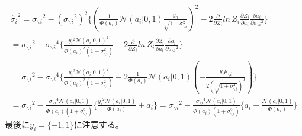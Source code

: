 \documentclass{jsarticle}
\begin{document}
\begin{equation}
\begin{split}
{\hat{\sigma}_i}^2 = {\sigma_{\backslash i}}^2 - ({\sigma_{\backslash i}}^2)^2\{ (\frac{1}{\Phi(a_i)} \mathcal{N}(a_i | 0, 1) \frac{y_n}{\sqrt{1 + \sigma_{\backslash i}^2}})^2 - 2 \frac{\partial}{\partial Z_i} ln \, Z_i \frac{\partial Z_i}{\partial a_i}\frac{\partial a_i}{\partial {\sigma_{\backslash i}}^2}\}\\
= {\sigma_{\backslash i}}^2 - {\sigma_{\backslash i}}^4\{ \frac{{y_i}^2\mathcal{N}(a_i | 0, 1)^2}{\Phi(a_i)^2(1 + \sigma_{\backslash i}^2)} - 2 \frac{\partial}{\partial Z_i} ln \, Z_i \frac{\partial Z_i}{\partial a_i}\frac{\partial a_i}{\partial {\sigma_{\backslash i}}^2}\}\\
= {\sigma_{\backslash i}}^2 - {\sigma_{\backslash i}}^4\{ \frac{{y_i}^2\mathcal{N}(a_i | 0, 1)^2}{\Phi(a_i)^2(1 + \sigma_{\backslash i}^2)} - 2 \frac{1}{\Phi(a_i)} \mathcal{N}(a_i | 0, 1)(-\frac{y_i \mu_{\backslash i}}{2(\sqrt{1 + \sigma_{\backslash i}^2})^3})\}\\
= {\sigma_{\backslash i}}^2 - \frac{{\sigma_{\backslash i}}^4 \mathcal{N}(a_i | 0, 1)}{\Phi(a_i)(1 + \sigma_{\backslash i}^2)}\{ \frac{{y_i}^2\mathcal{N}(a_i | 0, 1)}{\Phi(a_i)} + a_i\}
= {\sigma_{\backslash i}}^2 - \frac{{\sigma_{\backslash i}}^4 \mathcal{N}(a_i | 0, 1)}{\Phi(a_i)(1 + \sigma_{\backslash i}^2)}\{ a_i + \frac{\mathcal{N}(a_i | 0, 1)}{\Phi(a_i)}\}
\end{split}
\end{equation}
最後に$y_i = \{ -1, 1\}$に注意する。
\end{document}
